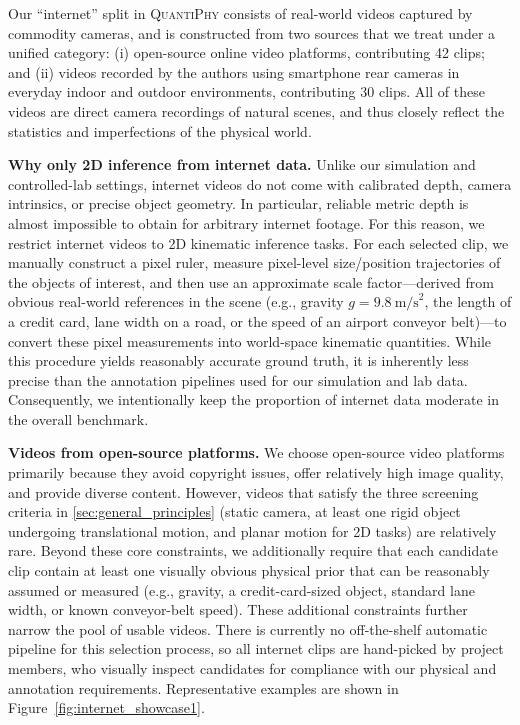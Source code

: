 Our ``internet'' split in \textsc{QuantiPhy} consists of real-world videos captured by commodity cameras, and is constructed from two sources that we treat under a unified category:
(i) open-source online video platforms, contributing 42 clips;
and (ii) videos recorded by the authors using smartphone rear cameras in everyday indoor and outdoor environments, contributing 30 clips.
All of these videos are direct camera recordings of natural scenes, and thus closely reflect the statistics and imperfections of the physical world.

\noindent\textbf{Why only 2D inference from internet data.}
Unlike our simulation and controlled-lab settings, internet videos do not come with calibrated depth, camera intrinsics, or precise object geometry.
In particular, reliable metric depth is almost impossible to obtain for arbitrary internet footage.
For this reason, we restrict internet videos to 2D kinematic inference tasks.
For each selected clip, we manually construct a pixel ruler, measure pixel-level size/position trajectories of the objects of interest, and then use an approximate scale factor---derived from obvious real-world references in the scene (e.g., gravity $g = 9.8\ \text{m/s}^2$, the length of a credit card, lane width on a road, or the speed of an airport conveyor belt)---to convert these pixel measurements into world-space kinematic quantities.
While this procedure yields reasonably accurate ground truth, it is inherently less precise than the annotation pipelines used for our simulation and lab data.
Consequently, we intentionally keep the proportion of internet data moderate in the overall benchmark.

\noindent\textbf{Videos from open-source platforms.}
We choose open-source video platforms primarily because they avoid copyright issues, offer relatively high image quality, and provide diverse content.
However, videos that satisfy the three screening criteria in \autoref{sec:general_principles} (static camera, at least one rigid object undergoing translational motion, and planar motion for 2D tasks) are relatively rare.
Beyond these core constraints, we additionally require that each candidate clip contain at least one visually obvious physical prior that can be reasonably assumed or measured (e.g., gravity, a credit-card-sized object, standard lane width, or known conveyor-belt speed).
These additional constraints further narrow the pool of usable videos.
There is currently no off-the-shelf automatic pipeline for this selection process, so all internet clips are hand-picked by project members, who visually inspect candidates for compliance with our physical and annotation requirements.
Representative examples are shown in Figure~\ref{fig:internet_showcase1}.

